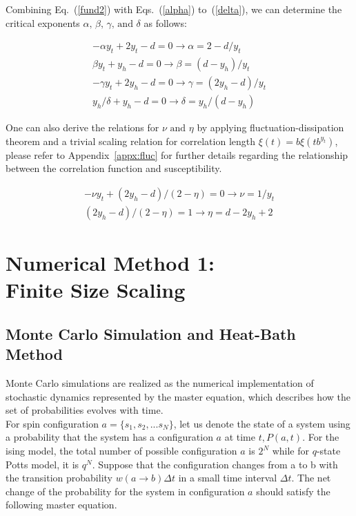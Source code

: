 \documentclass[%
 reprint,
 amsmath,amssymb,
 aps,
]{revtex4-2}
\begin{document}
Combining Eq.~(\ref{fund2}) with Eqs.~(\ref{alpha}) to~(\ref{delta}), we can determine 
the critical exponents $\alpha \text{, } \beta \text{, } \gamma \text{, and } \delta$ as 
follows:

\begin{gather}
-\alpha y_{t} + 2y_{t} - d = 0 \rightarrow \alpha = 2-d/y_{t} \\
\beta y_{t} + y_{h} - d = 0 \rightarrow \beta = (d-y_{h})/y_{t} \\
-\gamma y_{t} + 2y_{h} - d = 0 \rightarrow \gamma = (2y_{h}-d)/y_{t} \\
y_{h} / \delta + y_{h} - d = 0 \rightarrow \delta = y_{h}/(d-y_{h})
\end{gather}

One can also derive the relations for $\nu \text{ and } \eta$ by applying 
fluctuation-dissipation theorem and a trivial scaling relation for correlation length
$\xi(t) = b\xi(tb^{y_{t}})$, please refer to Appendix~\ref{appx:fluc} for further 
details regarding the relationship between the correlation function and susceptibility.

\begin{gather}
-\nu y_{t} + (2y_{h} - d)/(2 - \eta) = 0 \rightarrow \nu = 1/y_{t} \\
(2y_{h} - d)/(2 - \eta) = 1 \rightarrow \eta = d-2y_{h}+2
\end{gather}



\section{\label{sec:fss}Numerical Method 1: \\ Finite Size Scaling}
\subsection{Monte Carlo Simulation and Heat-Bath Method}
Monte Carlo simulations are realized as the numerical implementation of stochastic 
dynamics represented by the master equation, which describes how the set of probabilities 
evolves with time. \\

For spin configuration $a = \{s_{1}, s_{2}, ... s_{N}\}$, let us denote the state of a
system using a probability that the system has a configuration $a$ at time $t, P(a,t)$.
For the ising model, the total number of possible configuration $a$ is $2^N$ while 
for $q$-state Potts model, it is $q^N$.
Suppose that the configuration changes from a to b with the transition probability 
$w(a \rightarrow b)\Delta t$ in a small time interval $\Delta t$. The net change of the 
probability for the system in configuration $a$ should satisfy the following master equation.
\end{document}
